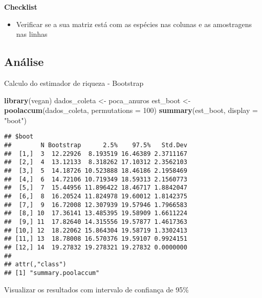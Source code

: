 \documentclass[
]{book}
\newenvironment{Shaded}{\begin{snugshade}}{\end{snugshade}}
\newcommand{\DataTypeTok}[1]{\textcolor[rgb]{0.13,0.29,0.53}{#1}}
\newcommand{\DecValTok}[1]{\textcolor[rgb]{0.00,0.00,0.81}{#1}}
\newcommand{\KeywordTok}[1]{\textcolor[rgb]{0.13,0.29,0.53}{\textbf{#1}}}
\newcommand{\NormalTok}[1]{#1}
\newcommand{\StringTok}[1]{\textcolor[rgb]{0.31,0.60,0.02}{#1}}
\providecommand{\tightlist}{%
  \setlength{\itemsep}{0pt}\setlength{\parskip}{0pt}}
\begin{document}
\textbf{Checklist}

\begin{itemize}
\tightlist
\item
  Verificar se a sua matriz está com as espécies nas colunas e as amostragens nas linhas
\end{itemize}

\hypertarget{anuxe1lise-5}{%
\subsection{Análise}\label{anuxe1lise-5}}

Calculo do estimador de riqueza - Bootstrap

\begin{Shaded}
\begin{Highlighting}[]
\KeywordTok{library}\NormalTok{(vegan)}
\NormalTok{dados_coleta <-}\StringTok{ }\NormalTok{poca_anuros}
\NormalTok{est_boot <-}\StringTok{ }\KeywordTok{poolaccum}\NormalTok{(dados_coleta, }\DataTypeTok{permutations =} \DecValTok{100}\NormalTok{)}
\KeywordTok{summary}\NormalTok{(est_boot, }\DataTypeTok{display =} \StringTok{"boot"}\NormalTok{)}
\end{Highlighting}
\end{Shaded}

\begin{verbatim}
## $boot
##        N Bootstrap      2.5%    97.5%   Std.Dev
##  [1,]  3  12.22926  8.193519 16.46389 2.3711167
##  [2,]  4  13.12133  8.318262 17.10312 2.3562103
##  [3,]  5  14.18726 10.523888 18.46186 2.1958469
##  [4,]  6  14.72106 10.719349 18.59313 2.1560773
##  [5,]  7  15.44956 11.896422 18.46717 1.8842047
##  [6,]  8  16.20524 11.824978 19.60012 1.8142375
##  [7,]  9  16.72008 12.307939 19.57946 1.7966583
##  [8,] 10  17.36141 13.485395 19.58909 1.6611224
##  [9,] 11  17.82640 14.315556 19.57877 1.4617363
## [10,] 12  18.22062 15.864304 19.58719 1.3302413
## [11,] 13  18.78008 16.570376 19.59107 0.9924151
## [12,] 14  19.27832 19.278321 19.27832 0.0000000
## 
## attr(,"class")
## [1] "summary.poolaccum"
\end{verbatim}

Visualizar os resultados com intervalo de confiança de 95\%
\end{document}
